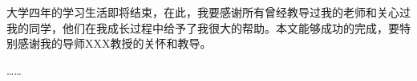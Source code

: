 \documentclass[../../main.tex]{subfiles}
\begin{document}
\begin{thankpage}
        大学四年的学习生活即将结束，在此，我要感谢所有曾经教导过我的老师和关心过我的同学，他们在我成长过程中给予了我很大的帮助。本文能够成功的完成，要特别感谢我的导师XXX教授的关怀和教导。

        ……
\end{thankpage}
\end{document}

